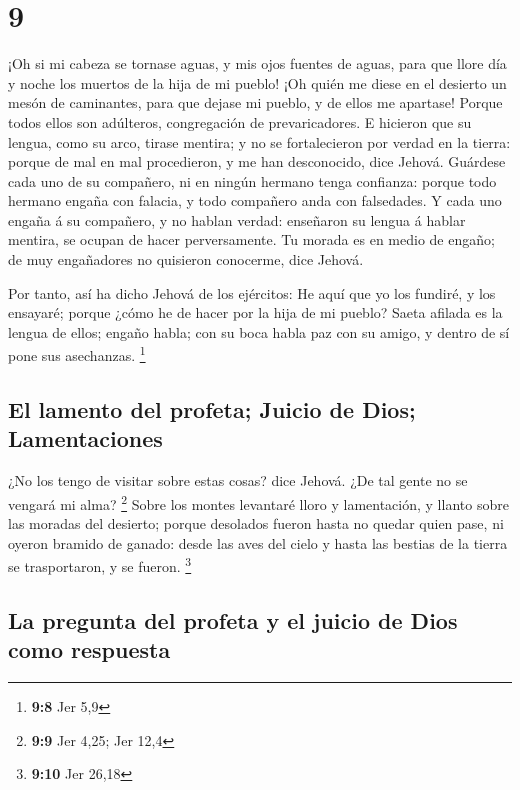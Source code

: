\hypertarget{section-8}{%
\section{9}\label{section-8}}

 ¡Oh si mi cabeza se tornase aguas, y mis ojos fuentes de
aguas, para que llore día y noche los muertos de la hija de mi pueblo!
 ¡Oh quién me diese en el desierto un mesón de caminantes,
para que dejase mi pueblo, y de ellos me apartase! Porque todos ellos
son adúlteros, congregación de prevaricadores.  E hicieron
que su lengua, como su arco, tirase mentira; y no se fortalecieron por
verdad en la tierra: porque de mal en mal procedieron, y me han
desconocido, dice Jehová.  Guárdese cada uno de su
compañero, ni en ningún hermano tenga confianza: porque todo hermano
engaña con falacia, y todo compañero anda con falsedades. 
Y cada uno engaña á su compañero, y no hablan verdad: enseñaron su
lengua á hablar mentira, se ocupan de hacer perversamente.
 Tu morada es en medio de engaño; de muy engañadores no
quisieron conocerme, dice Jehová.

 Por tanto, así ha dicho Jehová de los ejércitos: He aquí
que yo los fundiré, y los ensayaré; porque ¿cómo he de hacer por la hija
de mi pueblo?  Saeta afilada es la lengua de ellos; engaño
habla; con su boca habla paz con su amigo, y dentro de sí pone sus
asechanzas. \footnote{\textbf{9:8} Jer 5,9}

\hypertarget{el-lamento-del-profeta-juicio-de-dios-lamentaciones}{%
\subsection{El lamento del profeta; Juicio de Dios;
Lamentaciones}\label{el-lamento-del-profeta-juicio-de-dios-lamentaciones}}

 ¿No los tengo de visitar sobre estas cosas? dice Jehová.
¿De tal gente no se vengará mi alma? \footnote{\textbf{9:9} Jer 4,25;
  Jer 12,4}  Sobre los montes levantaré lloro y
lamentación, y llanto sobre las moradas del desierto; porque desolados
fueron hasta no quedar quien pase, ni oyeron bramido de ganado: desde
las aves del cielo y hasta las bestias de la tierra se trasportaron, y
se fueron. \footnote{\textbf{9:10} Jer 26,18}

\hypertarget{la-pregunta-del-profeta-y-el-juicio-de-dios-como-respuesta}{%
\subsection{La pregunta del profeta y el juicio de Dios como
respuesta}\label{la-pregunta-del-profeta-y-el-juicio-de-dios-como-respuesta}}

